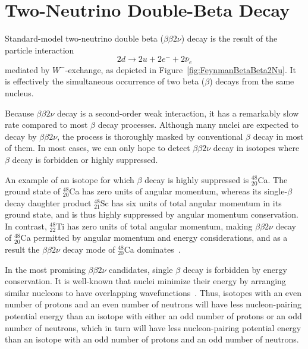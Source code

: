 \section{Two-Neutrino Double-Beta Decay}\label{sec:TheoryStandardDoubleBeta}

Standard-model two-neutrino double beta ($\beta\beta 2\nu$) decay is the result of the particle interaction
\begin{equation}\label{eqn:bb2n_decay_reaction}
2d \rightarrow 2u + 2e^- + 2\bar{\nu}_e
\end{equation}
mediated by $W^-$-exchange, as depicted in Figure~\ref{fig:FeynmanBetaBeta2Nu}.  It is effectively the simultaneous occurrence of two beta ($\beta$) decays from the same nucleus.

Because $\beta\beta 2\nu$ decay is a second-order weak interaction, it has a remarkably slow rate compared to most $\beta$ decay processes.  Although many nuclei are expected to decay by $\beta\beta 2\nu$, the process is thoroughly masked by conventional $\beta$ decay in most of them.  In most cases, we can only hope to detect $\beta\beta 2\nu$ decay in isotopes where $\beta$ decay is forbidden or highly suppressed.

An example of an isotope for which $\beta$ decay is highly suppressed is $^{48}_{20}$Ca.  The ground state of $^{48}_{20}$Ca has zero units of angular momentum, whereas its single-$\beta$ decay daughter product $^{48}_{21}$Sc has six units of total angular momentum in its ground state, and is thus highly suppressed by angular momentum conservation.  In contrast, $^{48}_{22}$Ti has zero units of total angular momentum, making $\beta\beta 2\nu$ decay of $^{48}_{20}$Ca permitted by angular momentum and energy considerations, and as a result the $\beta\beta 2\nu$ decay mode of $^{48}_{20}$Ca dominates~\cite{MyNuclearPhysicsBook}.

In the most promising $\beta\beta 2\nu$ candidates, single $\beta$ decay is forbidden by energy conservation.  It is well-known that nuclei minimize their energy by arranging similar nucleons to have overlapping wavefunctions~\cite{MyNuclearPhysicsBook}.  Thus, isotopes with an even number of protons and an even number of neutrons will have less nucleon-pairing potential energy than an isotope with either an odd number of protons or an odd number of neutrons, which in turn will have less nucleon-pairing potential energy than an isotope with an odd number of protons and an odd number of neutrons.

